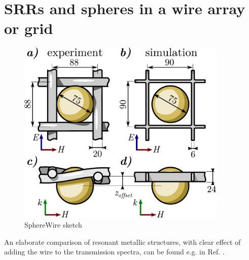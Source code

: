 \section{SRRs and spheres in a wire array or grid} %
\begin{figure} \caption{SphereWire sketch}  \centering  \includegraphics[width=10cm]{img/SphereWire_sketch.pdf} \end{figure} \clearpage


% 
An elaborate comparison of resonant metallic structures, with clear effect of adding the wire to the transmission spectra, can be found e.g. in Ref. \cite{koschny2004effective}.

